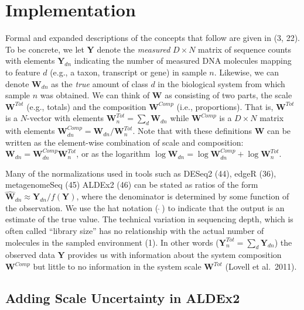 \documentclass[
]{article}
\begin{document}
\section{Implementation}\label{implementation}

Formal and expanded descriptions of the concepts that follow are given
in (3, 22). To be concrete, we let \(\mathbf{Y}\) denote the
\emph{measured} \(D \times N\) matrix of sequence counts with elements
\(\mathbf{Y}_{dn}\) indicating the number of measured DNA molecules
mapping to feature \(d\) (e.g., a taxon, transcript or gene) in sample
\(n\). Likewise, we can denote \(\mathbf{W}_{dn}\) as the \emph{true}
amount of class \(d\) in the biological system from which sample \(n\)
was obtained. We can think of \(\mathbf{W}\) as consisting of two parts,
the scale \(\mathbf{W}^{Tot}\) (e.g., totals) and the composition
\(\mathbf{W}^{Comp}\) (i.e., proportions). That is, \(\mathbf{W}^{Tot}\)
is a \(N\)-vector with elements
\(\mathbf{W}^{Tot}_{n}=\sum_{d}\mathbf{W}_{dn}\) while
\(\mathbf{W}^{Comp}\) is a \(D \times N\) matrix with elements
\(\mathbf{W}^{Comp}_{dn}=\mathbf{W}_{dn}/\mathbf{W}^{Tot}_{n}\). Note
that with these definitions \(\mathbf{W}\) can be written as the
element-wise combination of scale and composition:
\(\mathbf{W}_{dn}=\mathbf{W}^{Comp}_{dn}\mathbf{W}^{Tot}_{n}\), or as
the logarithm
\(\log \mathbf{W}_{dn}= \log \mathbf{W}^{Comp}_{dn} + \log \mathbf{W}^{Tot}_{n}\).

Many of the normalizations used in tools such as DESeq2 (44), edgeR
(36), metagenomeSeq (45) ALDEx2 (46) can be stated as ratios of the form
\(\hat{{\mathbf{W}}}_{dn} \approx \mathbf{Y}_{dn}/f(\mathbf{Y})\), where
the denominator is determined by some function of the observation. We
use the hat notation (\(\ \hat{}\ \)) to indicate that the output is an
estimate of the true value. The technical variation in sequencing depth,
which is often called ``library size'' has no relationship with the
actual number of molecules in the sampled environment (1). In other
words (\(\mathbf{Y}^{Tot}_{n}=\sum_{d}\mathbf{Y}_{dn}\)) the observed
data \(\mathbf{Y}\) provides us with information about the system
composition \(\mathbf{W}^{Comp}\) but little to no information in the
system scale \(\mathbf{W}^{Tot}\) (Lovell et al.~2011).

\subsection{Adding Scale Uncertainty in
ALDEx2}\label{adding-scale-uncertainty-in-aldex2}
\end{document}
